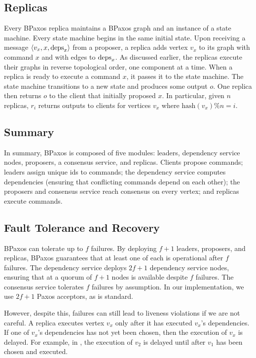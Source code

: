 \subsection{Replicas}
Every BPaxos replica maintains a BPaxos graph and an instance of a state
machine. Every state machine begins in the same initial state. Upon receiving a
message $\langle v_x, x, \text{deps}_x \rangle$ from a proposer, a replica adds vertex $v_x$
to its graph with command $x$ and with edges to $\text{deps}_x$. As discussed
earlier, the replicas execute their graphs in reverse topological order, one
component at a time. When a replica is ready to execute a command $x$, it
passes it to the state machine. The state machine transitions to a new state
and produces some output $o$. One replica then returns $o$ to the client that
initially proposed $x$. In particular, given $n$ replicas, $r_i$ returns
outputs to clients for vertices $v_x$ where $\text{hash}(v_x) \% n = i$.

\subsection{Summary}
In summary, BPaxos is composed of five modules: leaders, dependency service
nodes, proposers, a consensus service, and replicas. Clients propose commands;
leaders assign unique ids to commands; the dependency service computes
dependencies (ensuring that conflicting commands depend on each other); the
proposers and consensus service reach consensus on every vertex; and replicas
execute commands.

\subsection{Fault Tolerance and Recovery}
BPaxos can tolerate up to $f$ failures. By deploying $f+1$ leaders, proposers,
and replicas, BPaxos guarantees that at least one of each is operational after
$f$ failures. The dependency service deploys $2f+1$ dependency service nodes,
ensuring that at a quorum of $f+1$ nodes is available despite $f$ failures. The
consensus service tolerates $f$ failures by assumption. In our implementation,
we use $2f+1$ Paxos acceptors, as is standard.

However, despite this, failures can still lead to liveness violations if we are
not careful. A replica executes vertex $v_x$ only after it has executed $v_x$'s
dependencies. If one of $v_x$'s dependencies has not yet been chosen, then the
execution of $v_x$ is delayed. For example, in ,
the execution of $v_2$ is delayed until after $v_1$ has been chosen and
executed.

